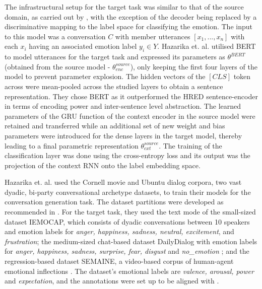  The infrastructural setup for the target task was similar to that of the source domain, as carried out by \cite{poria-etal-2017-context}, with the exception of the decoder being replaced by a discriminative mapping to the label space for classifying the emotion. The input to this model was a conversation $C$ with member utterances $[x_1,...,x_n]$ with each $x_i$ having an associated emotion label $y_i \in Y$. Hazarika et. al. utilised BERT \cite{Devlin2019BERTPO} to model utterances for the target task and expressed its parameters as $\theta^{BERT}$ (obtained from the source model - $\theta^{source}_{enc}$), only keeping the first four layers of the model to prevent parameter explosion. The hidden vectors of the $[CLS]$ token across were mean-pooled across the studied layers to obtain a sentence representation. They chose BERT as it outperformed the HRED sentence-encoder in terms of encoding power and inter-sentence level abstraction. The learned parameters of the GRU function of the context encoder in the source model were retained and transferred while an additional set of new weight and bias parameters were introduced for the dense layers in the target model, thereby leading to a final parametric representation $\theta^{source}_{cxt}$. The training of the classification layer was done using the cross-entropy loss and its output was the projection of the context RNN onto the label embedding space.

 Hazarika et. al. used the Cornell movie \cite{DanescuNiculescuMizil2011ChameleonsII} and Ubuntu dialog \cite{Lowe2015TheUD} corpora, two vast dyadic, bi-party conversational archetype datasets, to train their models for the conversation generation task. The dataset partitions were developed as recommended in \cite{Park2018AHL}. For the target task, they used the text mode of the small-sized dataset IEMOCAP, which consists of dyadic conversations between 10 speakers and emotion labels for \textit{anger, happiness, sadness, neutral, excitement}, and \textit{frustration}; the medium-sized chat-based dataset DailyDialog with emotion labels for \textit{anger, happiness, sadness, surprise, fear, disgust} and \textit{no\_emotion} \cite{Li2017DailyDialogAM}; and the regression-based dataset SEMAINE, a video-based corpus of human-agent emotional inflections \cite{5959155}. The dataset's emotional labels are \textit{valence, arousal, power} and \textit{expectation}, and the annotations were set up to be aligned with \cite{hazarika-etal-2018-icon}. 
 
